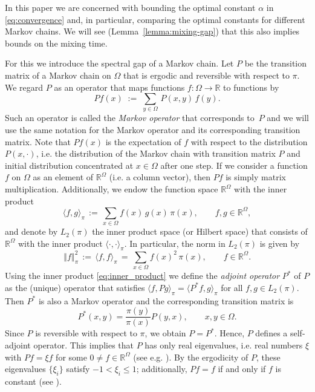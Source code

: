 \documentclass{dis}
\theoremstyle{citing}
\begin{document}
In this paper we are concerned with bounding the optimal 
constant ${\alpha}$ in \eqref{eq:convergence} and, in particular, 
comparing the optimal constants for different Markov chains. 
We will see (Lemma~\ref{lemma:mixing-gap}) that this also 
implies bounds on the mixing time.

For this we introduce the spectral gap of a Markov chain. 
Let $P$ be the transition matrix of a Markov chain on 
$\Omega$ that is ergodic and reversible with 
respect to $\pi$. 
We regard $P$ as an operator that maps functions 
$f:{\Omega}\to{\ensuremath{\mathbb{R}}}$ to functions by
\begin{equation} \label{eq:map}
Pf(x) \;:=\; \sum_{y\in{\Omega}}\,P(x,y)\,f(y).
\end{equation}
Such an operator is called the 
\emph{Markov operator} 
that corresponds to~$P$ and we will use the same notation 
for the Markov operator and its corresponding transition matrix. 
Note that $Pf(x)$ is the expectation of $f$ with respect to the 
distribution $P(x,\cdot)$, i.e. the distribution of the Markov 
chain with transition matrix $P$ and initial distribution 
concentrated at $x\in{\Omega}$ after one step.
If we consider a function $f$ on ${\Omega}$ as an element of ${\ensuremath{\mathbb{R}}}^{\Omega}$ 
(i.e. a column vector), 
then $Pf$ is simply matrix multiplication. 
Additionally, we endow the function space  
${\ensuremath{\mathbb{R}}}^{\Omega}$ with the inner product
\begin{equation} \label{eq:inner_product}
{\langle} f, g{\rangle}_\pi \,:=\, \sum_{x\in{\Omega}} f(x)\, g(x)\, \pi(x), 
	\qquad f,g\in{\ensuremath{\mathbb{R}}}^{\Omega},
\end{equation}
and denote by $L_2(\pi)$ the inner product space (or Hilbert space) 
that consists of ${\ensuremath{\mathbb{R}}}^{\Omega}$ with the inner product 
${\langle}\cdot,\cdot{\rangle}_\pi$. In particular, the norm in $L_2(\pi)$ 
is given by 
\[
{\left\Vert {f} \right\Vert}_\pi^2 \,:=\, {\langle} f, f{\rangle}_\pi
\,=\, \sum_{x\in{\Omega}}f(x)^2\,\pi(x), \qquad f\in{\ensuremath{\mathbb{R}}}^{\Omega}.
\]
Using the inner product \eqref{eq:inner_product} we define 
the \emph{adjoint operator} 
$P^*$ of $P$ as the (unique) 
operator that satisfies ${\langle} f, Pg{\rangle}_{\pi} = {\langle} P^*f, g{\rangle}_{\pi}$ 
for all $f,g\in L_2(\pi)$. Then $P^*$ is also a Markov 
operator and the corresponding transition matrix is 
\begin{equation} \label{eq:adjoint}
P^*(x,y) = \frac{\pi(y)}{\pi(x)} P(y,x), \qquad x,y\in{\Omega}.
\end{equation}
Since $P$ is reversible with respect to $\pi$, we obtain  
$P=P^*$. Hence, $P$ defines a self-adjoint operator.
This 
implies that 
$P$ has only real eigenvalues, i.e. real numbers $\xi$ with 
$Pf=\xi f$ for some $0\neq f\in{\ensuremath{\mathbb{R}}}^{\Omega}$  
(see e.g. \cite[Thm.~9.1-1]{Krey}). 
By the ergodicity of $P$, 
these eigenvalues $\{\xi_i\}$ satisfy $-1<\xi_i\le1$; 
additionally, $Pf=f$ if and only if $f$ is constant (see 
\cite[Lemma~12.1]{LPW}).
\end{document}
